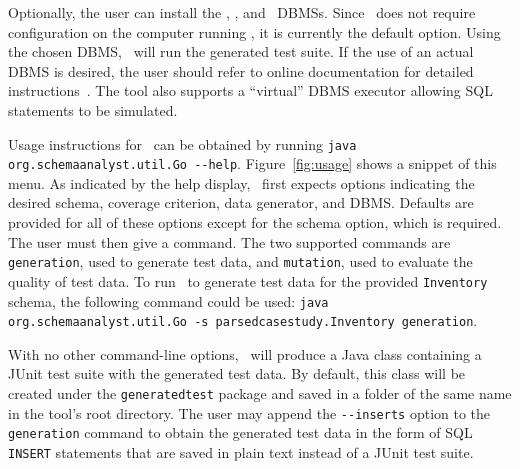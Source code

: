 

Optionally, the user can install the \postgres, \sqlite, and \hypersql~DBMSs. Since \sqlite~does not require
configuration on the computer running \sa, it is currently the default option. Using the chosen DBMS, \sa~will run the
generated test suite. If the use of an actual DBMS is desired, the user should refer to online documentation for detailed
instructions~\cite{tool}. The tool also supports a ``virtual'' DBMS executor allowing SQL statements to be simulated.




Usage instructions for \sa~can be obtained by running \lstinline{java org.schemaanalyst.util.Go --help}.
Figure~\ref{fig:usage} shows a snippet of this menu.  As indicated by the help display, \sa~first expects options
indicating the desired schema, coverage criterion, data generator, and DBMS\@. Defaults are provided for all of these
options except for the schema option, which is required. The user must then give a command.  The two supported commands
are \lstinline{generation}, used to generate test data, and \lstinline{mutation}, used to evaluate the quality of test
data.  To run \sa~to generate test data for the provided \texttt{Inventory} schema, the following command could be used:
\lstinline{java org.schemaanalyst.util.Go -s parsedcasestudy.Inventory generation}.


With no other command-line options, \sa~will produce a Java class containing a JUnit test suite with the generated test
data. By default, this class will be created under the \texttt{generatedtest} package and saved in a folder of the same
name in the tool's root directory.  The user may append the \lstinline{--inserts} option to the \lstinline{generation}
command to obtain the generated test data in the form of SQL \texttt{INSERT} statements that are saved in plain text
instead of a JUnit test suite.




